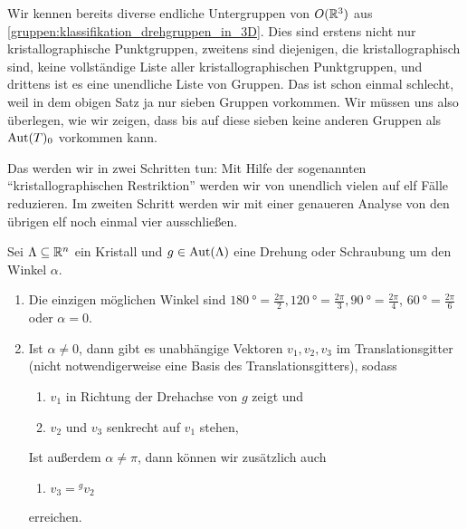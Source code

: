 \begin{remark}
Wir kennen bereits diverse endliche Untergruppen von $O(\mathbb{R}^3)$ aus \ref{gruppen:klassifikation_drehgruppen_in_3D}. Dies sind erstens nicht nur kristallographische Punktgruppen, zweitens sind diejenigen, die kristallographisch sind, keine vollständige Liste aller kristallographischen Punktgruppen, und drittens ist es eine unendliche Liste von Gruppen. Das ist schon einmal schlecht, weil in dem obigen Satz ja nur sieben Gruppen vorkommen. Wir müssen uns also überlegen, wie wir zeigen, dass bis auf diese sieben keine anderen Gruppen als $\operatorname{Aut}(T)_0$ vorkommen kann.

Das werden wir in zwei Schritten tun: Mit Hilfe der sogenannten \enquote{kristallographischen Restriktion} werden wir von unendlich vielen auf elf Fälle reduzieren. Im zweiten Schritt werden wir mit einer genaueren Analyse von den übrigen elf noch einmal vier ausschließen.
\end{remark}

\begin{theorem}\label{kristalle:kristallographische_einschraenkung}
Sei $\Lambda\subseteq\mathbb{R}^n$ ein Kristall und $g\in\operatorname{Aut}(\Lambda)$ eine Drehung oder Schraubung um den Winkel $\alpha$.
\begin{enumerate}
\item Die einzigen möglichen Winkel sind $\SI{180}{\degree}=\frac{2\pi}{2}, \SI{120}{\degree}= \frac{2\pi}{3}, \SI{90}{\degree}=\frac{2\pi}{4}$, $\SI{60}{\degree}=\frac{2\pi}{6}$ oder $\alpha=0$.
\item Ist $\alpha\neq 0$, dann gibt es unabhängige Vektoren $v_1, v_2, v_3$ im Translationsgitter (nicht notwendigerweise eine Basis des Translationsgitters), sodass
\begin{enumerate}
\item $v_1$ in Richtung der Drehachse von $g$ zeigt und
\item $v_2$ und $v_3$ senkrecht auf $v_1$ stehen,
\end{enumerate}
Ist außerdem $\alpha\neq\pi$, dann können wir zusätzlich auch
\begin{enumerate}[resume]
\item $v_3={^g v_2}$
\end{enumerate}
erreichen.
\end{enumerate}
\end{theorem}

